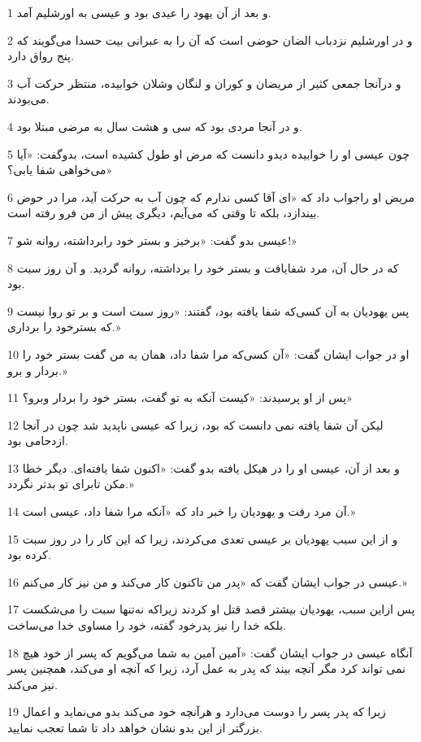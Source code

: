 \par 1 و بعد از آن یهود را عیدی بود و عیسی به اورشلیم آمد.
\par 2 و در اورشلیم نزدباب الضان حوضی است که آن را به عبرانی بیت حسدا می‌گویند که پنج رواق دارد.
\par 3 و درآنجا جمعی کثیر از مریضان و کوران و لنگان وشلان خوابیده، منتظر حرکت آب می‌بودند.
\par 4 و در آنجا مردی بود که سی و هشت سال به مرضی مبتلا بود.
\par 5 چون عیسی او را خوابیده دیدو دانست که مرض او طول کشیده است، بدوگفت: «آیا می‌خواهی شفا یابی؟»
\par 6 مریض او راجواب داد که «ای آقا کسی ندارم که چون آب به حرکت آید، مرا در حوض بیندازد، بلکه تا وقتی که می‌آیم، دیگری پیش از من فرو رفته است.
\par 7 عیسی بدو گفت: «برخیز و بستر خود رابرداشته، روانه شو!»
\par 8 که در حال آن، مرد شفایافت و بستر خود را برداشته، روانه گردید. و آن روز سبت بود.
\par 9 پس یهودیان به آن کسی‌که شفا یافته بود، گفتند: «روز سبت است و بر تو روا نیست که بسترخود را برداری.»
\par 10 او در جواب ایشان گفت: «آن کسی‌که مرا شفا داد، همان به من گفت بستر خود را بردار و برو.»
\par 11 پس از او پرسیدند: «کیست آنکه به تو گفت، بستر خود را بردار وبرو؟»
\par 12 لیکن آن شفا یافته نمی دانست که بود، زیرا که عیسی ناپدید شد چون در آنجا ازدحامی بود.
\par 13 و بعد از آن، عیسی او را در هیکل یافته بدو گفت: «اکنون شفا یافته‌ای. دیگر خطا مکن تابرای تو بدتر نگردد.»
\par 14 آن مرد رفت و یهودیان را خبر داد که «آنکه مرا شفا داد، عیسی است.»
\par 15 و از این سبب یهودیان بر عیسی تعدی می‌کردند، زیرا که این کار را در روز سبت کرده بود.
\par 16 عیسی در جواب ایشان گفت که «پدر من تاکنون کار می‌کند و من نیز کار می‌کنم.»
\par 17 پس ازاین سبب، یهودیان بیشتر قصد قتل او کردند زیراکه نه‌تنها سبت را می‌شکست بلکه خدا را نیز پدرخود گفته، خود را مساوی خدا می‌ساخت.
\par 18 آنگاه عیسی در جواب ایشان گفت: «آمین آمین به شما می‌گویم که پسر از خود هیچ نمی تواند کرد مگر آنچه بیند که پدر به عمل آرد، زیرا که آنچه او می‌کند، همچنین پسر نیز می‌کند.
\par 19 زیرا که پدر پسر را دوست می‌دارد و هرآنچه خود می‌کند بدو می‌نماید و اعمال بزرگتر از این بدو نشان خواهد داد تا شما تعجب نمایید.
